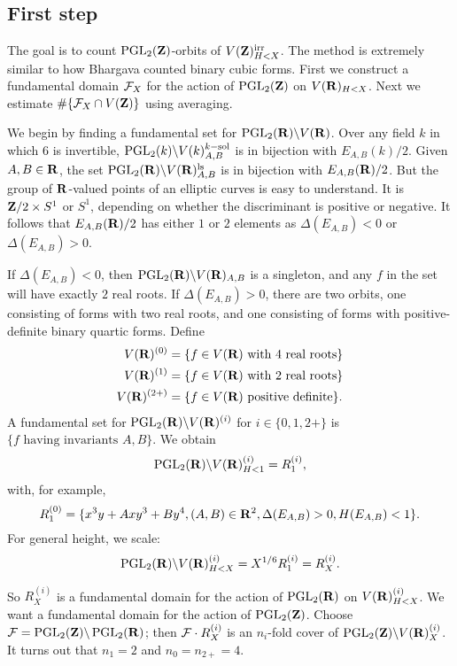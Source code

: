 \subsection{First step}

The goal is to count $\operatorname{PGL}_2(\mathbf{Z})$-orbits of 
$V(\mathbf{Z})_{H<X}^\mathrm{irr}$. The method is extremely similar to how Bhargava 
counted binary cubic forms. First we construct a fundamental domain $\mathcal{F}_X$ for 
the action of $\operatorname{PGL}_2(\mathbf{Z})$ on $V(\mathbf{R})_{H<X}$. Next we 
estimate $\#\{\mathcal{F}_X\cap V(\mathbf{Z})\}$ using averaging. 

We begin by finding a fundamental set for 
$\operatorname{PGL}_2(\mathbf{R})\backslash V(\mathbf{R})$. Over any field $k$ in 
which $6$ is invertible, 
$\operatorname{PGL}_2(k)\backslash V(k)_{A,B}^{k-\mathrm{sol}}$ is 
in bijection with $E_{A,B}(k)/2$. Given $A,B\in \mathbf{R}$, the set 
$\operatorname{PGL}_2(\mathbf{R})\backslash V(\mathbf{R})_{A,B}^\mathrm{ls}$ is in 
bijection with $E_{A,B}(\mathbf{R})/2$. But the group of $\mathbf{R}$-valued points of an 
elliptic curves is easy to understand. It is $\mathbf{Z}/2\times S^1$ or $S^1$, 
depending on whether the discriminant is positive or negative. It follows that 
$E_{A,B}(\mathbf{R})/2$ has either $1$ or $2$ elements as $\Delta(E_{A,B})<0$ or 
$\Delta(E_{A,B})>0$. 

If $\Delta(E_{A,B})<0$, then 
$\operatorname{PGL}_2(\mathbf{R})\backslash V(\mathbf{R})_{A,B}$ is a singleton, and 
any $f$ in the set will have exactly $2$ real roots. If 
$\Delta(E_{A,B})>0$, there are two orbits, one consisting of forms with two 
real roots, and one consisting of forms with positive-definite binary quartic 
forms. Define 
\begin{align*}
  V(\mathbf{R})^{(0)} &= \{f\in V(\mathbf{R})\text{ with 4 real roots}\} \\
  V(\mathbf{R})^{(1)} &= \{f\in V(\mathbf{R})\text{ with 2 real roots}\} \\
  V(\mathbf{R})^{(2+)} &= \{f\in V(\mathbf{R})\text{ positive definite}\} .
\end{align*}
A fundamental set for $\operatorname{PGL}_2(\mathbf{R})\backslash V(\mathbf{R})^{(i)}$ 
for $i\in \{0,1,2+\}$ is $\{f\text{ having invariants }A,B\}$. We obtain 
\[
  \operatorname{PGL}_2(\mathbf{R})\backslash V(\mathbf{R})^{(i)}_{H<1} = R_1^{(i)} ,
\]
with, for example, 
\[
  R_1^{(0)} = \{x^3 y + A x y^3 + B y^4,(A,B)\in \mathbf{R}^2,\Delta(E_{A,B})>0,H(E_{A,B})<1\} .
\]
For general height, we scale: 
\[
  \operatorname{PGL}_2(\mathbf{R})\backslash V(\mathbf{R})_{H<X}^{(i)} = X^{1/6} R_1^{(i)} = R_X^{(i)} .
\]

So $R_X^{(i)}$ is a fundamental domain for the action of 
$\operatorname{PGL}_2(\mathbf{R})$ on $V(\mathbf{R})_{H<X}^{(i)}$. We want a 
fundamental domain for the action of $\operatorname{PGL}_2(\mathbf{Z})$. Choose 
$\mathcal{F}=\operatorname{PGL}_2(\mathbf{Z})\backslash \operatorname{PGL}_2(\mathbf{R})$; 
then $\mathcal{F}\cdot R_X^{(i)}$ is an $n_i$-fold cover of 
$\operatorname{PGL}_2(\mathbf{Z})\backslash V(\mathbf{R})_X^{(i)}$. It turns out that 
$n_1=2$ and $n_0 = n_{2+} = 4$. 

